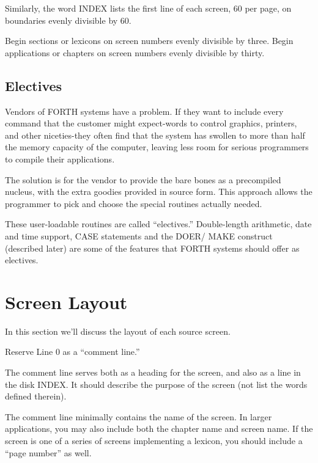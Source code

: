 Similarly, the word INDEX lists the first line of each screen, 60 per
page, on boundaries evenly divisible by 60.

\begin{tip}
Begin sections or lexicons on screen numbers evenly divisible by three.
Begin applications or chapters on screen numbers evenly divisible by
thirty.
\end{tip}

\othersidetrue\subsection{Electives}
\othersidefalse
Vendors of FORTH systems have a problem.  If they want to include
every command that the customer might expect-words to control
graphics, printers, and other niceties-they often find that the system
has swollen to more than half the memory capacity of the computer, leaving
less room for serious programmers to compile their applications.

The solution is for the vendor to provide the bare bones as a precompiled
nucleus, with the extra goodies provided in source form.  This approach
allows the programmer to pick and choose the special routines
actually needed.

These user-loadable routines are called ``electives.'' Double-length
arithmetic, date and time support, CASE statements and the DOER/
MAKE construct (described later) are some of the features that FORTH
systems should offer as electives.

\section{Screen Layout}

In this section we'll discuss the layout of each source screen.

\begin{tip}
Reserve Line 0 as a ``comment line.''
\end{tip}

The comment line serves both as a heading for the screen, and also as a
line in the disk INDEX.  It should describe the purpose of the screen (not
list the words defined therein).

The comment line minimally contains the name of the screen.  In
larger applications, you may also include both the chapter name and
screen name.  If the screen is one of a series of screens implementing a
lexicon, you should include a ``page number'' as well.

